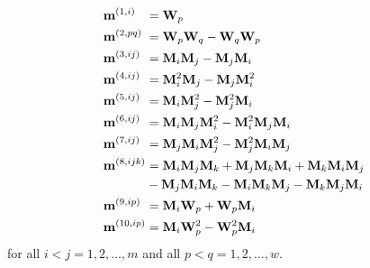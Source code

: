 %
\begin{subequations}
\label{E:29}
\begin{align}
	\mathmakebox[\widthof{$\mathbf{m}^{(8,ijk)}$}][l]{\mathbf{m}^{(1,i)}}
	&= \mathbf{W}_p \\ 
	\mathmakebox[\widthof{$\mathbf{m}^{(8,ijk)}$}][l]{\mathbf{m}^{(2,pq)}}
	&= \mathbf{W}_p \mathbf{W}_q - \mathbf{W}_q \mathbf{W}_p \\ 
	\mathmakebox[\widthof{$\mathbf{m}^{(8,ijk)}$}][l]{\mathbf{m}^{(3,ij)}}
	&= \mathbf{M}_i \mathbf{M}_j - \mathbf{M}_j \mathbf{M}_i \\ 
	\mathmakebox[\widthof{$\mathbf{m}^{(8,ijk)}$}][l]{\mathbf{m}^{(4,ij)}}
	&= \mathbf{M}^2_i \mathbf{M}_j - \mathbf{M}_j \mathbf{M}^2_i \\
	\mathmakebox[\widthof{$\mathbf{m}^{(8,ijk)}$}][l]{\mathbf{m}^{(5,ij)}}
	&= \mathbf{M}_i \mathbf{M}^2_j - \mathbf{M}^2_j \mathbf{M}_i \\
	\mathmakebox[\widthof{$\mathbf{m}^{(8,ijk)}$}][l]{\mathbf{m}^{(6,ij)}}
	&= \mathbf{M}_i \mathbf{M}_j \mathbf{M}^2_i  
	-  \mathbf{M}^2_i \mathbf{M}_j \mathbf{M}_i \\ 
	\mathmakebox[\widthof{$\mathbf{m}^{(8,ijk)}$}][l]{\mathbf{m}^{(7,ij)}}
	&= \mathbf{M}_j \mathbf{M}_i \mathbf{M}^2_j  
	-  \mathbf{M}^2_j \mathbf{M}_i \mathbf{M}_j \\
	\mathmakebox[\widthof{$\mathbf{m}^{(8,ijk)}$}][l]{\mathbf{m}^{(8,ijk)}}
	&= \mathbf{M}_i \mathbf{M}_j \mathbf{M}_k 
	 + \mathbf{M}_j \mathbf{M}_k \mathbf{M}_i  
	 + \mathbf{M}_k \mathbf{M}_i \mathbf{M}_j \notag \\
	&- \mathbf{M}_j \mathbf{M}_i \mathbf{M}_k 
	 - \mathbf{M}_i \mathbf{M}_k \mathbf{M}_j 
	 - \mathbf{M}_k \mathbf{M}_j \mathbf{M}_i \\
	\mathmakebox[\widthof{$\mathbf{m}^{(8,ijk)}$}][l]{\mathbf{m}^{(9,ip)}}
	&= \mathbf{M}_i \mathbf{W}_p + \mathbf{W}_p \mathbf{M}_i   \\
	\mathmakebox[\widthof{$\mathbf{m}^{(8,ijk)}$}][l]{\mathbf{m}^{(10,ip)}}
	&= \mathbf{M}_i \mathbf{W}^2_p-\mathbf{W}^2_p \mathbf{M}_i 
\end{align}
\end{subequations}	
%
%      
for all $i<j = 1,2,\ldots,m$   and all $p<q = 1,2,\ldots,w$.

